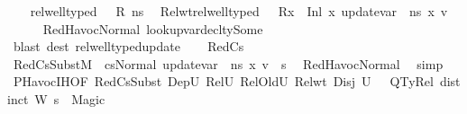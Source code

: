 \begin{isabellebody}
\ \ \isamarkupfalse%
\ {\isacartoucheopen}rel{\isacharunderscore}{\kern0pt}well{\isacharunderscore}{\kern0pt}typed\ {\isasymLambda}\ {\isasymOmega}\ R\ ns{\isacartoucheclose}\ \isamarkupfalse%
\ Rel{\isacharunderscore}{\kern0pt}wt{\isacharcolon}{\kern0pt}{\isacartoucheopen}rel{\isacharunderscore}{\kern0pt}well{\isacharunderscore}{\kern0pt}typed\ {\isasymLambda}\ {\isasymOmega}\ {\isacharparenleft}{\kern0pt}R{\isacharparenleft}{\kern0pt}x\ {\isasymmapsto}\ Inl\ x{\isacharprime}{\kern0pt}{\isacharparenright}{\kern0pt}{\isacharparenright}{\kern0pt}\ {\isacharparenleft}{\kern0pt}update{\isacharunderscore}{\kern0pt}var\ {\isasymLambda}\ ns\ x\ v{\isacharparenright}{\kern0pt}{\isacartoucheclose}\isanewline
\ \ \ \ \isamarkupfalse%
\ RedHavocNormal\ lookup{\isacharunderscore}{\kern0pt}var{\isacharunderscore}{\kern0pt}decl{\isacharunderscore}{\kern0pt}ty{\isacharunderscore}{\kern0pt}Some\isanewline
\ \ \ \ \isamarkupfalse%
\ {\isacharparenleft}{\kern0pt}blast\ dest{\isacharcolon}{\kern0pt}\ rel{\isacharunderscore}{\kern0pt}well{\isacharunderscore}{\kern0pt}typed{\isacharunderscore}{\kern0pt}update{\isacharparenright}{\kern0pt}\isanewline
\ \ \isamarkupfalse%
\ RedCs{}\ \isamarkupfalse%
\ RedCs{}Subst{\isacharcolon}{\kern0pt}{\isachardoublequoteopen}M{\isacharcomma}{\kern0pt}{\isasymLambda}{\isacharcomma}{\kern0pt}{\isasymGamma}{\isacharcomma}{\kern0pt}{\isasymOmega}\ {\isasymturnstile}\ {\isasymlangle}cs{}{\isacharcomma}{\kern0pt}Normal\ {\isacharparenleft}{\kern0pt}update{\isacharunderscore}{\kern0pt}var\ {\isasymLambda}\ ns\ x\ v{\isacharparenright}{\kern0pt}{\isasymrangle}\ {\isacharbrackleft}{\kern0pt}{\isasymrightarrow}{\isacharbrackright}{\kern0pt}\ s{\isacharprime}{\kern0pt}{\isachardoublequoteclose}\ \isamarkupfalse%
\ RedHavocNormal\ \isamarkupfalse%
\ simp\isanewline
\ \ \isamarkupfalse%
\ PHavoc{\isachardot}{\kern0pt}IH{\isacharbrackleft}{\kern0pt}OF\ RedCs{}Subst\ DepU{}\ RelU{}\ RelOldU{}\ Rel{\isacharunderscore}{\kern0pt}wt\ Disj\ {\isacartoucheopen}{\isacharquery}{\kern0pt}U{}\ {\isasymnoteq}\ {\isacharbraceleft}{\kern0pt}{\isacharbraceright}{\kern0pt}{\isacartoucheclose}\ QTyRel\ {\isacartoucheopen}distinct\ W{\isacartoucheclose}\ {\isacartoucheopen}s{\isacharprime}{\kern0pt}\ {\isasymnoteq}\ Magic{\isacartoucheclose}{\isacharbrackright}{\kern0pt}\ \isamarkupfalse%

\end{isabellebody}
